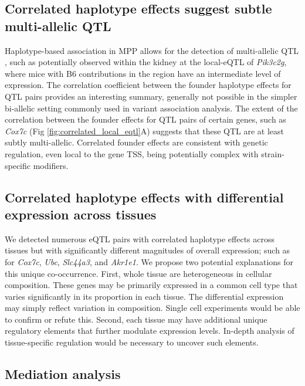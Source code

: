 \documentclass[10pt,letterpaper]{article}
\begin{document}
\subsection*{Correlated haplotype effects suggest subtle multi-allelic QTL}
Haplotype-based association in MPP allows for the detection of multi-allelic QTL \cite{Crowley2015}, such as potentially observed within the kidney at the local-eQTL of \textit{Pik3c2g}, where mice with B6 contributions in the region have an intermediate level of expression. The correlation coefficient between the founder haplotype effects for QTL pairs provides an interesting summary, generally not possible in the simpler bi-allelic setting commonly used in variant association analysis. The extent of the correlation between the founder effects for QTL pairs of certain genes, such as \textit{Cox7c} (Fig \ref{fig:correlated_local_eqtl}A) suggests that these QTL are at least subtly multi-allelic. Correlated founder effects are consistent with genetic regulation, even local to the gene TSS, being potentially complex with strain-specific modifiers.

\subsection*{Correlated haplotype effects with differential expression across tissues}

We detected numerous eQTL pairs with correlated haplotype effects across tissues but with significantly different magnitudes of overall expression; such as for \textit{Cox7c}, \textit{Ubc}, \textit{Slc44a3}, and \textit{Akr1e1}. We propose two potential explanations for this unique co-occurrence. 
First, whole tissue are heterogeneous in cellular composition. These genes may be primarily expressed in a common cell type that varies significantly in its proportion in each tissue. The differential expression may simply reflect variation in composition. Single cell experiments would be able to confirm or refute this. 
Second, each tissue may have additional unique regulatory elements that further modulate expression levels. In-depth analysis of tissue-specific regulation would be necessary to uncover such elements. 

\subsection*{Mediation analysis}
\end{document}
